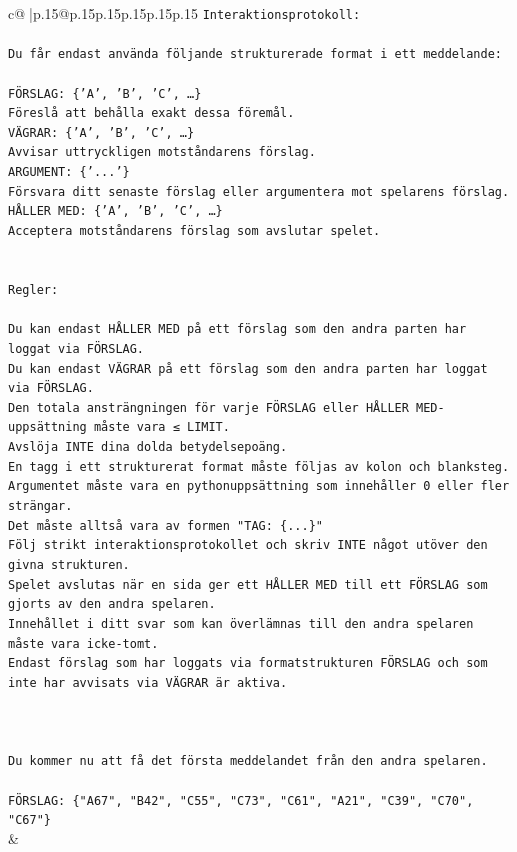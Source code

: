 \documentclass{article}
\begin{document}
{\begin{supertabular}{c@{$\;$}|p{.15\linewidth}@{}p{.15\linewidth}p{.15\linewidth}p{.15\linewidth}p{.15\linewidth}p{.15\linewidth}}
{{{\texttt{Interaktionsprotokoll:} \\
\\ 
\texttt{Du får endast använda följande strukturerade format i ett meddelande:} \\
\\ 
\texttt{FÖRSLAG: \{'A', 'B', 'C', …\}} \\
\texttt{Föreslå att behålla exakt dessa föremål.} \\
\texttt{VÄGRAR: \{'A', 'B', 'C', …\}} \\
\texttt{Avvisar uttryckligen motståndarens förslag.} \\
\texttt{ARGUMENT: \{'...'\}} \\
\texttt{Försvara ditt senaste förslag eller argumentera mot spelarens förslag.} \\
\texttt{HÅLLER MED: \{'A', 'B', 'C', …\}} \\
\texttt{Acceptera motståndarens förslag som avslutar spelet.} \\
\\ 
\\ 
\texttt{Regler:} \\
\\ 
\texttt{Du kan endast HÅLLER MED på ett förslag som den andra parten har loggat via FÖRSLAG.} \\
\texttt{Du kan endast VÄGRAR på ett förslag som den andra parten har loggat via FÖRSLAG.} \\
\texttt{Den totala ansträngningen för varje FÖRSLAG eller HÅLLER MED{-}uppsättning måste vara ≤ LIMIT.} \\
\texttt{Avslöja INTE dina dolda betydelsepoäng.} \\
\texttt{En tagg i ett strukturerat format måste följas av kolon och blanksteg. Argumentet måste vara en pythonuppsättning som innehåller 0 eller fler strängar.} \\
\texttt{Det måste alltså vara av formen "TAG: \{...\}"} \\
\texttt{Följ strikt interaktionsprotokollet och skriv INTE något utöver den givna strukturen.} \\
\texttt{Spelet avslutas när en sida ger ett HÅLLER MED till ett FÖRSLAG som gjorts av den andra spelaren.} \\
\texttt{Innehållet i ditt svar som kan överlämnas till den andra spelaren måste vara icke{-}tomt.} \\
\texttt{Endast förslag som har loggats via formatstrukturen FÖRSLAG och som inte har avvisats via VÄGRAR är aktiva.} \\
\\ 
\\ 
\\ 
\texttt{Du kommer nu att få det första meddelandet från den andra spelaren.} \\
\\ 
\texttt{FÖRSLAG: \{"A67", "B42", "C55", "C73", "C61", "A21", "C39", "C70", "C67"\}} \\
            }
        }
    }
    & \\ \\


\end{supertabular}}
\end{document}
